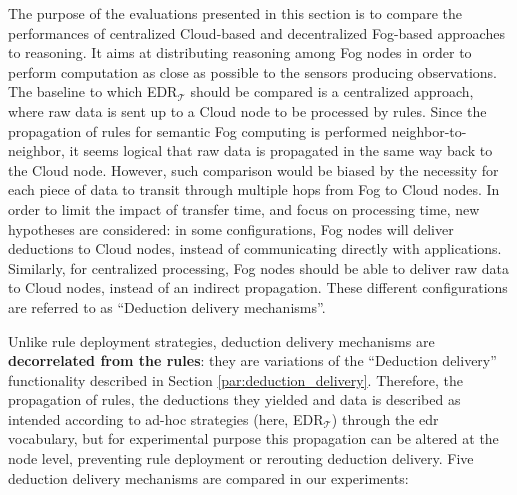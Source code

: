 \documentclass{iosart2c}
\newcommand{\edrt}{EDR$_{\mathcal{T}}$\xspace}
\begin{document}
The purpose of the evaluations presented in this section is to compare the performances of centralized Cloud-based and decentralized Fog-based approaches to reasoning.
It aims at distributing reasoning among Fog nodes in order to perform computation as close as possible to the sensors producing observations.
The baseline to which \edrt should be compared is a centralized approach, where raw data is sent up to a Cloud node to be processed by rules.
Since the propagation of rules for semantic Fog computing is performed neighbor-to-neighbor, it seems logical that raw data is propagated in the same way back to the Cloud node.
However, such comparison would be biased by the necessity for each piece of data to transit through multiple hops from Fog to Cloud nodes.
In order to limit the impact of transfer time, and focus on processing time, new hypotheses are considered: in some configurations, Fog nodes will deliver deductions to Cloud nodes, instead of communicating directly with applications.
Similarly, for centralized processing, Fog nodes should be able to deliver raw data to Cloud nodes, instead of an indirect propagation.
These different configurations are referred to as ``Deduction delivery mechanisms''.

Unlike rule deployment strategies, deduction delivery mechanisms are \textbf{decorrelated from the rules}: they are variations of the ``Deduction delivery'' functionality described in Section \textsection \ref{par:deduction_delivery}.
Therefore, the propagation of rules, the deductions they yielded and data is described as intended according to ad-hoc strategies (here, \edrt) through the \gls{edr} vocabulary, but for experimental purpose this propagation can be altered at the node level, preventing rule deployment or rerouting deduction delivery.
Five deduction delivery mechanisms are compared in our experiments: 
\end{document}
